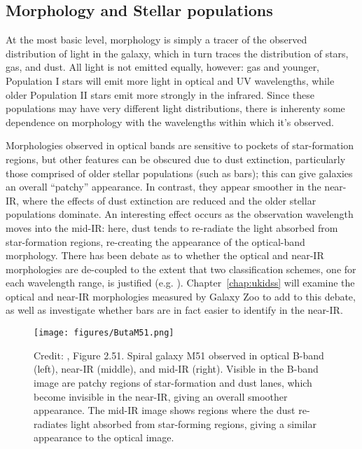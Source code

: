 \subsection{Morphology and Stellar populations}

At the most basic level, morphology is simply a tracer of the observed distribution of light in the galaxy, which in turn traces the distribution of stars, gas, and dust. All light is not emitted equally, however: gas and younger, Population I stars will emit more light in optical and UV wavelengths, while older Population II stars emit more strongly in the infrared. Since these populations may have very different light distributions, there is inherenty some dependence on morphology with the wavelengths within which it's observed. 

Morphologies observed in optical bands are sensitive to pockets of star-formation regions, but other features can be obscured due to dust extinction, particularly those comprised of older stellar populations (such as bars); this can give galaxies an overall ``patchy'' appearance. In contrast, they appear smoother in the near-IR, where the effects of dust extinction are reduced and the older stellar populations dominate. An interesting effect occurs as the observation wavelength moves into the mid-IR: here, dust tends to re-radiate the light absorbed from star-formation regions, re-creating the appearance of the optical-band morphology. There has been debate as to whether the optical and near-IR morphologies are de-coupled to the extent that two classification schemes, one for each wavelength range, is justified (e.g. \citet{Block1999}). Chapter~\ref{chap:ukidss} will examine the optical and near-IR morphologies measured by Galaxy Zoo to add to this debate, as well as investigate whether bars are in fact easier to identify in the near-IR.

\begin{figure}
\centering
\texttt{[image: figures/ButaM51.png]}
\caption{Credit: \citet{Buta2013}, Figure 2.51. Spiral galaxy M51 observed in optical B-band (left), near-IR (middle), and mid-IR (right). Visible in the B-band image are patchy regions of star-formation and dust lanes, which become invisible in the near-IR, giving an overall smoother appearance. The mid-IR image shows regions where the dust re-radiates light absorbed from star-forming regions, giving a similar appearance to the optical image. }
\label{fig:buta51}
\end{figure} 

